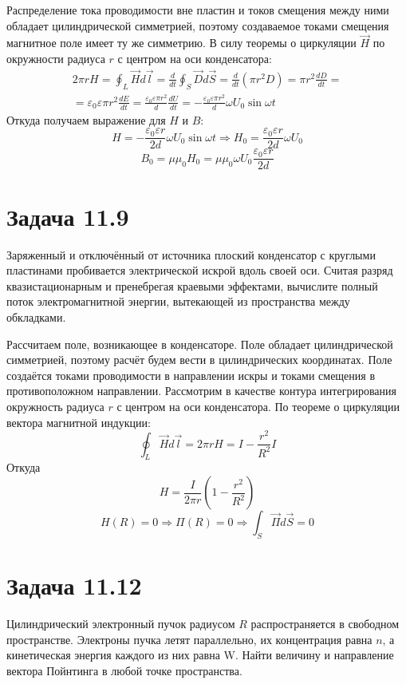 \documentclass[11pt]{article}
\begin{document}
Распределение тока проводимости вне пластин и токов смещения между ними обладает цилиндрической симметрией, поэтому
создаваемое токами смещения магнитное поле имеет ту же симметрию. В силу теоремы о циркуляции \(\vec H\) по окружности
радиуса \(r\) с центром на оси конденсатора:
\begin{multline*}
2\pi rH = \oint_L\vec Hd\vec l = \frac{d}{dt}\oint_S\vec Dd\vec S = \frac{d}{dt}(\pi r^2D) = \pi r^2\frac{dD}{dt} = \\
= \varepsilon_0\varepsilon\pi r^2\frac{dE}{dt} = \frac{\varepsilon_0\varepsilon\pi r^2}{d}\frac{dU}{dt}
= -\frac{\varepsilon_0\varepsilon\pi r^2}{d}\omega U_0\sin \omega t
\end{multline*}
Откуда получаем выражение для \(H\) и \(B\):
$$H = -\frac{\varepsilon_0\varepsilon r}{2d}\omega U_0\sin\omega t \Rightarrow H_0 = \frac{\varepsilon_0\varepsilon r}{2d}\omega U_0$$
$$B_0 = \mu\mu_0 H_0 = \mu\mu_0\omega U_0\frac{\varepsilon_0\varepsilon r}{2d}$$
\section{Задача 11.9}
\label{sec:orgd8147f0}
Заряженный и отключённый от источника плоский конденсатор с круглыми пластинами пробивается электрической искрой
вдоль своей оси. Считая разряд квазистационарным и пренебрегая краевыми эффектами, вычислите полный поток электромагнитной
энергии, вытекающей из пространства между обкладками.

Рассчитаем поле, возникающее в конденсаторе. Поле обладает цилиндрической симметрией, поэтому расчёт будем вести в
цилиндрических координатах. Поле создаётся токами проводимости в направлении искры и токами смещения в противоположном
направлении. Рассмотрим в качестве контура интегрирования окружность радиуса \(r\) с центром на оси конденсатора. По
теореме о циркуляции вектора магнитной индукции:
$$\oint_L\vec Hd\vec l = 2\pi rH = I - \frac{r^2}{R^2}I$$
Откуда
$$H = \frac{I}{2\pi r}\left(1 - \frac{r^2}{R^2}\right)$$
$$H(R) = 0 \Rightarrow \Pi(R) = 0 \Rightarrow \int_S\vec\Pi d\vec S = 0$$
\section{Задача 11.12}
\label{sec:org0756c05}
Цилиндрический электронный пучок радиусом \(R\) распространяется в свободном пространстве. Электроны пучка летят
параллельно, их концентрация равна \(n\), а кинетическая энергия каждого из них равна W. Найти величину и направление
вектора Пойнтинга в любой точке пространства.
\end{document}
